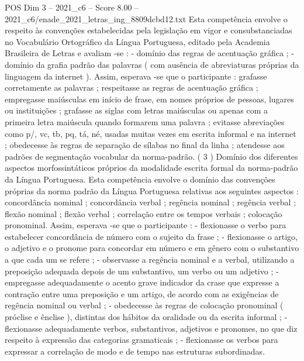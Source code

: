 \begin{textsample}{POS Dim 3 – 2021\_c6 – Score 8.00 – 2021\_c6/enade\_2021\_letras\_ing\_8809dcbd12.txt}
Esta competência envolve o respeito às convenções estabelecidas pela legislação em vigor e consubstanciadas no Vocabulário Ortográfico da Língua Portuguesa, editado pela Academia Brasileira de Letras e avaliam -se : - domínio das regras de acentuação gráfica ; - domínio da grafia padrão das palavras ( com ausência de abreviaturas próprias da linguagem da internet ).
Assim, esperava -se que o participante : grafasse corretamente as palavras ; respeitasse as regras de acentuação gráfica ; empregasse maiúsculas em início de frase, em nomes próprios de pessoas, lugares ou instituições ; grafasse as siglas com letras maiúsculas ou apenas com a primeira letra maiúscula quando formarem uma palavra ; evitasse abreviações como p/, vc, tb, pq, tá, né, usadas muitas vezes em escrita informal e na internet ; obedecesse às regras de separação de sílabas no final da linha ; atendesse aos padrões de segmentação vocabular da norma-padrão. ( 3 ) Domínio dos diferentes aspectos morfossintáticos próprios da modalidade escrita formal da norma-padrão da Língua Portuguesa.
Esta competência envolve o domínio das convenções próprias da norma padrão da Língua Portuguesa relativas aos seguintes aspectos : concordância nominal ; concordância verbal ; regência nominal ; regência verbal ; flexão nominal ; flexão verbal ; correlação entre os tempos verbais ; colocação pronominal.
Assim, esperava -se que o participante : - flexionasse o verbo para estabelecer concordância de número com o sujeito da frase ; - flexionasse o artigo, o adjetivo e o pronome para concordar em número e em gênero com o substantivo a que cada um se refere ; - observasse a regência nominal e a verbal, utilizando a preposição adequada depois de um substantivo, um verbo ou um adjetivo ; - empregasse adequadamente o acento grave indicador da crase que expresse a contração entre uma preposição e um artigo, de acordo com as exigências de regência nominal ou verbal ; - obedecesse às regras de colocação pronominal ( próclise e ênclise ), distintas dos hábitos da oralidade ou da escrita informal ; - flexionasse adequadamente verbos, substantivos, adjetivos e pronomes, no que diz respeito à expressão das categorias gramaticais ; - flexionasse os verbos para expressar a correlação de modo e de tempo nas estruturas subordinadas.

\end{textsample}
